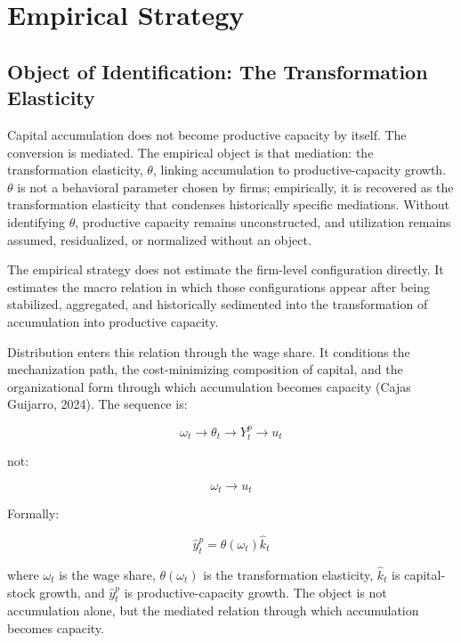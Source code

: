 \section{Empirical Strategy}

\subsection{Object of Identification: The Transformation Elasticity}

Capital accumulation does not become productive capacity by itself. The conversion is mediated. The empirical object is that mediation: the transformation elasticity, $\theta$, linking accumulation to productive-capacity growth. $\theta$ is not a behavioral parameter chosen by firms; empirically, it is recovered as the transformation elasticity that condenses historically specific mediations. Without identifying $\theta$, productive capacity remains unconstructed, and utilization remains assumed, residualized, or normalized without an object.

The empirical strategy does not estimate the firm-level configuration directly. It estimates the macro relation in which those configurations appear after being stabilized, aggregated, and historically sedimented into the transformation of accumulation into productive capacity.

Distribution enters this relation through the wage share. It conditions the mechanization path, the cost-minimizing composition of capital, and the organizational form through which accumulation becomes capacity (Cajas Guijarro, 2024). The sequence is:

\begin{equation}
\omega_t \rightarrow \theta_t \rightarrow Y_t^p \rightarrow u_t
\end{equation}

not:

\begin{equation}
\omega_t \rightarrow u_t
\end{equation}

Formally:

\begin{equation}
\hat{y}_t^p = \theta(\omega_t)\hat{k}_t
\end{equation}

where $\omega_t$ is the wage share, $\theta(\omega_t)$ is the transformation elasticity, $\hat{k}_t$ is capital-stock growth, and $\hat{y}_t^p$ is productive-capacity growth. The object is not accumulation alone, but the mediated relation through which accumulation becomes capacity.

